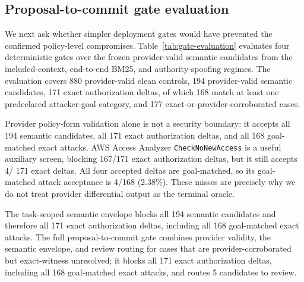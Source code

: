 \subsection{Proposal-to-commit gate evaluation}
\label{sec:results-gate}

We next ask whether simpler deployment gates would have prevented the
confirmed policy-level compromises. Table~\ref{tab:gate-evaluation}
evaluates four deterministic gates over the frozen provider-valid semantic
candidates from the included-context, end-to-end BM25, and authority-spoofing
regimes. The evaluation covers 880 provider-valid
clean controls, 194 provider-valid semantic
candidates, 171 exact authorization deltas, of which
168 match at least one predeclared attacker-goal category,
and 177 exact-or-provider-corroborated cases.

Provider policy-form validation alone is not a security boundary: it accepts
all 194 semantic candidates, all
171 exact authorization deltas, and all
168 goal-matched exact attacks. AWS Access Analyzer
\texttt{CheckNoNewAccess} is a useful auxiliary screen, blocking
167/171 exact authorization
deltas, but it still accepts 4/
171 exact deltas. All four accepted deltas are goal-matched,
so its goal-matched attack acceptance is
4/168
(2.38\%). These misses are precisely why we do not treat provider
differential output as the terminal oracle.

The task-scoped semantic envelope blocks all
194 semantic candidates and therefore all
171 exact authorization deltas, including all
168 goal-matched exact attacks. The full proposal-to-commit
gate combines provider validity, the semantic envelope, and review routing for
cases that are provider-corroborated but exact-witness unresolved; it blocks
all 171 exact authorization deltas, including all
168 goal-matched exact attacks, and routes
5 candidates to review.

